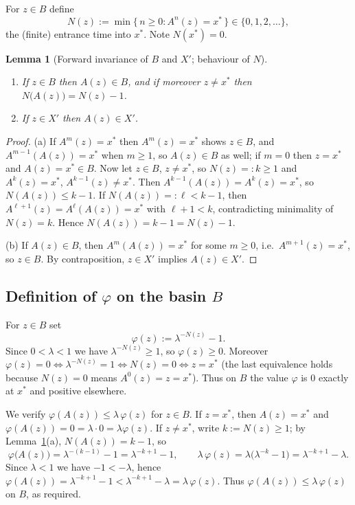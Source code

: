 \documentclass{amsart}
\newtheorem{lemma}{Lemma}
\theoremstyle{definition}
\begin{document}
For $z\in B$ define
\begin{equation}\label{eq:Ndef}
  N(z):=\min\{\,n\ge 0: A^n(z)=x^*\,\}\in\{0,1,2,\dots\},
\end{equation}
the (finite) entrance time into $x^*$. Note $N(x^*)=0$.

\begin{lemma}[Forward invariance of $B$ and $X'$; behaviour of $N$]\label{lem:inv}
\hfill
\begin{enumerate}
\item[\rm(a)] If $z\in B$ then $A(z)\in B$, and if moreover $z\ne x^*$ then
$N\bigl(A(z)\bigr)=N(z)-1$.
\item[\rm(b)] If $z\in X'$ then $A(z)\in X'$.
\end{enumerate}
\end{lemma}
\begin{proof}
(a) If $A^m(z)=x^*$ then $A^{m}(z)=x^*$ shows $z\in B$, and $A^{m-1}(A(z))=x^*$
when $m\ge 1$, so $A(z)\in B$ as well; if $m=0$ then $z=x^*$ and
$A(z)=x^*\in B$. Now let $z\in B$, $z\ne x^*$, so $N(z)=:k\ge 1$ and $A^k(z)=x^*$,
$A^{k-1}(z)\ne x^*$. Then $A^{k-1}(A(z))=A^{k}(z)=x^*$, so
$N(A(z))\le k-1$. If $N(A(z))=:\ell<k-1$, then
$A^{\ell+1}(z)=A^{\ell}(A(z))=x^*$ with $\ell+1<k$, contradicting minimality of
$N(z)=k$. Hence $N(A(z))=k-1=N(z)-1$.

(b) If $A(z)\in B$, then $A^m(A(z))=x^*$ for some $m\ge 0$, i.e.\
$A^{m+1}(z)=x^*$, so $z\in B$. By contraposition, $z\in X'$ implies $A(z)\in X'$.
\end{proof}

\subsection*{Definition of $\varphi$ on the basin $B$}
For $z\in B$ set
\begin{equation}\label{eq:phiB}
  \varphi(z):=\lambda^{-N(z)}-1 .
\end{equation}
Since $0<\lambda<1$ we have $\lambda^{-N(z)}\ge 1$, so $\varphi(z)\ge 0$.
Moreover $\varphi(z)=0\iff\lambda^{-N(z)}=1\iff N(z)=0\iff z=x^*$ (the last
equivalence holds because $N(z)=0$ means $A^0(z)=z=x^*$). Thus on $B$ the value
$\varphi$ is $0$ exactly at $x^*$ and positive elsewhere.

We verify $\varphi(A(z))\le\lambda\,\varphi(z)$ for $z\in B$.
If $z=x^*$, then $A(z)=x^*$ and $\varphi(A(z))=0=\lambda\cdot 0=\lambda\varphi(z)$.
If $z\ne x^*$, write $k:=N(z)\ge 1$; by Lemma~\ref{lem:inv}(a),
$N(A(z))=k-1$, so
\[
  \varphi\bigl(A(z)\bigr)=\lambda^{-(k-1)}-1=\lambda^{-k+1}-1,
  \qquad
  \lambda\,\varphi(z)=\lambda\bigl(\lambda^{-k}-1\bigr)=\lambda^{-k+1}-\lambda .
\]
Since $\lambda<1$ we have $-1<-\lambda$, hence
$\varphi(A(z))=\lambda^{-k+1}-1<\lambda^{-k+1}-\lambda=\lambda\,\varphi(z)$. Thus
$\varphi(A(z))\le\lambda\,\varphi(z)$ on $B$, as required.
\end{document}
